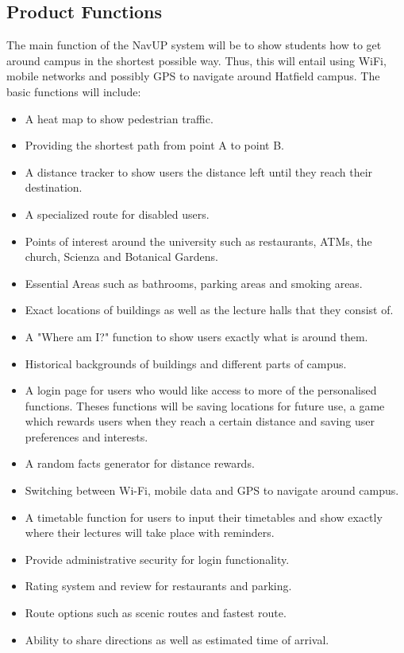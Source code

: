 \documentclass{article}
\begin{document}
		\subsection{Product Functions} {The main function of the NavUP system will be to show students how to get around campus in the shortest possible way. Thus, this will entail using WiFi, mobile networks and possibly GPS to navigate around Hatfield campus. The basic functions will include:  }
	\begin{itemize}
  		\item A heat map to show pedestrian traffic.
		\item Providing the shortest path from point A to point B.
 		 \item A distance tracker to show users the distance left until they reach their destination.
		\item A specialized route for disabled users.
		\item Points of interest around the university such as restaurants, ATMs, the church, Scienza and Botanical Gardens.
 		 \item Essential Areas such as bathrooms, parking areas and smoking areas.
		\item Exact locations of buildings as well as the lecture halls that they consist of.
		\item A "Where am I?" function to show users exactly what is around them.
 		 \item Historical backgrounds of buildings and different parts of campus.
		\item A login page for users who would like access to more of the personalised functions. Theses functions will be saving locations for future use, a game which rewards users when they reach a certain distance and saving user preferences and interests.
		\item A random facts generator for distance rewards.
		\item Switching between Wi-Fi, mobile data and GPS to navigate around campus.
		\item A timetable function for users to input their timetables and show exactly where their lectures will take place with reminders.
		\item Provide administrative security for login functionality.
		\item Rating system and review for restaurants and parking.
		\item Route options such as scenic routes and fastest route.
		\item Ability to share directions as well as estimated time of arrival.
	\end{itemize}
\end{document}
